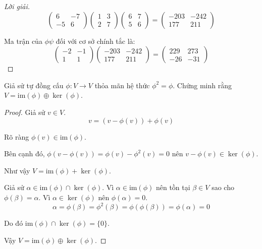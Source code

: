 \documentclass[class=linearalgebra,crop=false]{standalone}
\begin{document}
\begin{proof}[Lời giải]
\[\begin{pmatrix}
            6 & -7 \\
            -5 & 6
        \end{pmatrix}
        \begin{pmatrix}
            1 & 3 \\
            2 & 7
        \end{pmatrix}
        \begin{pmatrix}
            6 & 7 \\
            5 & 6
        \end{pmatrix}=
        \begin{pmatrix}
            -203 & -242 \\
            177 & 211
        \end{pmatrix}
    \]
    \par Ma trận của $\phi\psi$ đối với cơ sở chính tắc là:
    \[
        \begin{pmatrix}
            -2 & -1 \\
            1 & 1
        \end{pmatrix}
        \begin{pmatrix}
            -203 & -242 \\
            177 & 211
        \end{pmatrix}=
        \begin{pmatrix}
            229 & 273 \\
            -26 & -31
        \end{pmatrix}
    \]
\end{proof}

\begin{exercise}
    Giả sử tự đồng cấu $\phi: V\to V$ thỏa mãn hệ thức $\phi^{2} = \phi$. Chứng minh rằng $V = \text{im}(\phi)\oplus\ker(\phi)$.
\end{exercise}

\begin{proof}
    Giả sử $v\in V$.
    \[
        v = (v - \phi(v)) + \phi(v)
    \]
    \par Rõ ràng $\phi(v)\in\text{im}(\phi)$.
    \par Bên cạnh đó, $\phi(v - \phi(v)) = \phi(v) - \phi^{2}(v) = 0$ nên $v - \phi(v)\in\ker(\phi)$.
    \par Như vậy $V = \text{im}(\phi)+\ker(\phi)$.
    \bigskip
    \par Giả sử $\alpha\in\text{im}(\phi)\cap\ker(\phi)$. Vì $\alpha\in\text{im}(\phi)$ nên tồn tại $\beta\in V$ sao cho $\phi(\beta) = \alpha$. Vì $\alpha\in\ker(\phi)$ nên $\phi(\alpha) = 0$.
    \[
        \alpha = \phi(\beta) = \phi^{2}(\beta) = \phi(\phi(\beta)) = \phi(\alpha) = 0
    \]
    \par Do đó $\text{im}(\phi)\cap\ker(\phi) = \{ 0 \}$.
    \par Vậy $V = \text{im}(\phi)\oplus\ker(\phi)$.
\end{proof}
\end{document}
